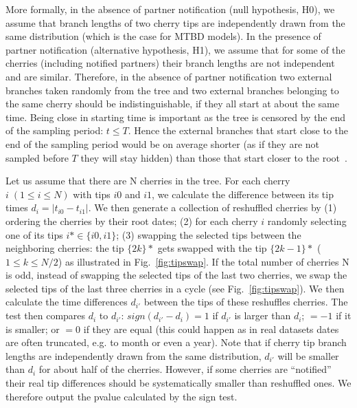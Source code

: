 \documentclass[a4paper,10pt]{article}
\begin{document}
More formally, in the absence of partner notification (null hypothesis, H0), we assume that branch lengths of two cherry tips are independently drawn from the same distribution (which is the case for MTBD models). In the presence of partner notification (alternative hypothesis, H1), we assume that for some of the cherries (including notified partners) their branch lengths are not independent and are similar. Therefore, in the absence of partner notification two external branches taken randomly from the tree and two external branches belonging to the same cherry should be indistinguishable, if they all start at about the same time. Being close in starting time is important as the tree is censored by the end of the sampling period: $t \leq T$. Hence the external branches that start close to the end of the sampling period would be on average shorter (as if they are not sampled before $T$ they will stay hidden) than those that start closer to the root~\citep{mooersBranchLengthsBirth2012}. %

Let us assume that there are N cherries in the tree. For each cherry $i\;(1 \leq i \leq N)$ with tips $i0$ and $i1$, we calculate the difference between its tip times $d_i = |t_{i0} - t_{i1}|$. We then generate a collection of reshuffled cherries by (1) ordering the cherries by their root dates; (2) for each cherry $i$ randomly selecting one of its tips $i* \in \{i0, i1\}$; (3) swapping the selected tips between the neighboring cherries: the tip $\{2k\}*$ gets swapped with the tip $\{2k-1\}*$ ($1 \leq k \leq N / 2$) as illustrated in Fig.~\ref{fig:tipswap}. If the total number of cherries N is odd, instead of swapping the selected tips of the last two cherries, we swap the selected tips of the last three cherries in a cycle (see Fig.~\ref{fig:tipswap}). We then calculate the time differences $d_{i'}$ between the tips of these reshuffles cherries. 
The test then compares $d_i$ to $d_{i'}$: $sign(d_{i'} - d_i) = 1$ if $d_{i'}$ is larger than $d_i$; $= -1$ if it is smaller; or $= 0$ if they are equal (this could happen as in real datasets dates are often truncated, e.g. to month or even a year). Note that if cherry tip branch lengths are independently drawn from the same distribution, $d_{i'}$ will be smaller than $d_i$ for about half of the cherries. However, if some cherries are ``notified'' their real tip differences should be systematically smaller than reshuffled ones. We therefore output the pvalue calculated by the sign test.
\end{document}
